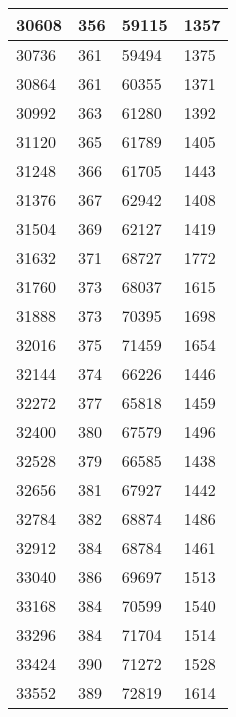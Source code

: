 \begin{longtable}{|l|l|l|l|}
		30608 & 356         & 59115           & 1357             \\ \hline
		30736 & 361         & 59494           & 1375             \\ \hline
		30864 & 361         & 60355           & 1371             \\ \hline
		30992 & 363         & 61280           & 1392             \\ \hline
		31120 & 365         & 61789           & 1405             \\ \hline
		31248 & 366         & 61705           & 1443             \\ \hline
		31376 & 367         & 62942           & 1408             \\ \hline
		31504 & 369         & 62127           & 1419             \\ \hline
		31632 & 371         & 68727           & 1772             \\ \hline
		31760 & 373         & 68037           & 1615             \\ \hline
		31888 & 373         & 70395           & 1698             \\ \hline
		32016 & 375         & 71459           & 1654             \\ \hline
		32144 & 374         & 66226           & 1446             \\ \hline
		32272 & 377         & 65818           & 1459             \\ \hline
		32400 & 380         & 67579           & 1496             \\ \hline
		32528 & 379         & 66585           & 1438             \\ \hline
		32656 & 381         & 67927           & 1442             \\ \hline
		32784 & 382         & 68874           & 1486             \\ \hline
		32912 & 384         & 68784           & 1461             \\ \hline
		33040 & 386         & 69697           & 1513             \\ \hline
		33168 & 384         & 70599           & 1540             \\ \hline
		33296 & 384         & 71704           & 1514             \\ \hline
		33424 & 390         & 71272           & 1528             \\ \hline
		33552 & 389         & 72819           & 1614             \\ \hline

\end{longtable}
